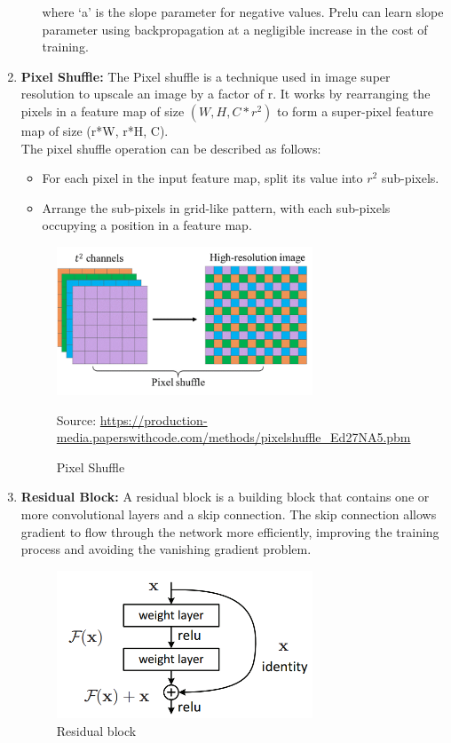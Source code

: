 \begin{enumerate}[label=(\roman*)]
\begin{itemize}
               where ‘a’ is the slope parameter for negative values. Prelu can learn slope parameter using backpropagation at a negligible increase in the cost of training.
        \end{itemize}
        \item {\bf Pixel Shuffle:} The Pixel shuffle is a technique used in image super resolution to upscale an image by a factor of r. It works by rearranging the pixels in a feature map of size $(W,H,C * r^2)$ to form a super-pixel feature map of size (r*W, r*H, C). \cite{r7}\\The pixel shuffle operation can be described as follows:
        \begin{itemize}
            \item For each pixel in the input feature map, split its value into $r^2$ sub-pixels.
            \item Arrange the sub-pixels in grid-like pattern, with each sub-pixels occupying a position in a feature map.
        \end{itemize}
        \begin{figure}[ht]
            \centering
            \includegraphics[width=3in]{./figures/pixelshuffle.png}
            \caption{Pixel Shuffle}
            \par  Source: \url{https://production-media.paperswithcode.com/methods/pixelshuffle_Ed27NA5.pbm}
        \end{figure}
        \item {\bf Residual Block:} A residual block is a building block that contains one or more convolutional layers and a skip connection. The skip connection allows gradient to flow through the network more efficiently, improving the training process and avoiding the vanishing gradient problem.
        \begin{figure}[h!]
            \centering
            \includegraphics[width=3in]{./figures/residualblock.png}
            \caption{Residual block}
        \end{figure}
    \end{enumerate}
    \nocite{r8}

